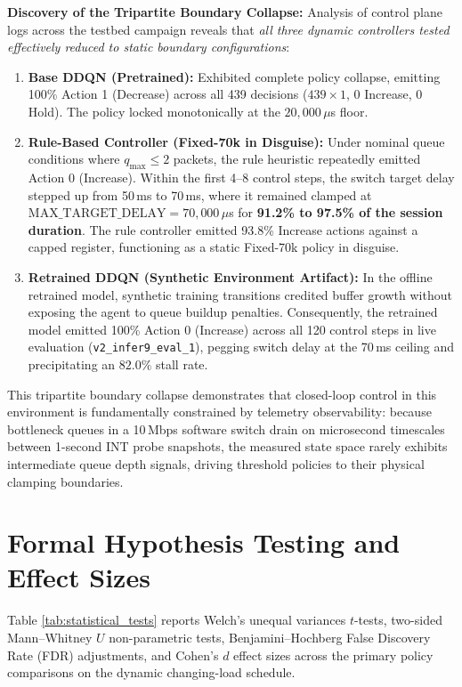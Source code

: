 \documentclass[12pt,a4paper,oneside]{report}
\begin{document}
\textbf{Discovery of the Tripartite Boundary Collapse:}
Analysis of control plane logs across the testbed campaign reveals that \emph{all three dynamic controllers tested effectively reduced to static boundary configurations}:
\begin{enumerate}[label=\arabic*.]
  \item \textbf{Base DDQN (Pretrained):} Exhibited complete policy collapse, emitting 100\% Action 1 (Decrease) across all 439 decisions ($439 \times 1$, 0 Increase, 0 Hold). The policy locked monotonically at the $20,000\,\mu$s floor.
  \item \textbf{Rule-Based Controller (Fixed-70k in Disguise):} Under nominal queue conditions where $q_{\max} \le 2$ packets, the rule heuristic repeatedly emitted Action 0 (Increase). Within the first 4--8 control steps, the switch target delay stepped up from 50\,ms to 70\,ms, where it remained clamped at $\text{MAX\_TARGET\_DELAY} = 70,000\,\mu$s for \textbf{91.2\% to 97.5\% of the session duration}. The rule controller emitted 93.8\% Increase actions against a capped register, functioning as a static Fixed-70k policy in disguise.
  \item \textbf{Retrained DDQN (Synthetic Environment Artifact):} In the offline retrained model, synthetic training transitions credited buffer growth without exposing the agent to queue buildup penalties. Consequently, the retrained model emitted 100\% Action 0 (Increase) across all 120 control steps in live evaluation (\texttt{v2\_infer9\_eval\_1}), pegging switch delay at the 70\,ms ceiling and precipitating an $82.0\%$ stall rate.
\end{enumerate}
This tripartite boundary collapse demonstrates that closed-loop control in this environment is fundamentally constrained by telemetry observability: because bottleneck queues in a 10\,Mbps software switch drain on microsecond timescales between 1-second INT probe snapshots, the measured state space rarely exhibits intermediate queue depth signals, driving threshold policies to their physical clamping boundaries.


\section{Formal Hypothesis Testing and Effect Sizes}
\label{sec:hypothesis_testing}
Table \ref{tab:statistical_tests} reports Welch's unequal variances $t$-tests, two-sided Mann--Whitney $U$ non-parametric tests, Benjamini--Hochberg False Discovery Rate (FDR) adjustments, and Cohen's $d$ effect sizes across the primary policy comparisons on the dynamic changing-load schedule.
\end{document}
